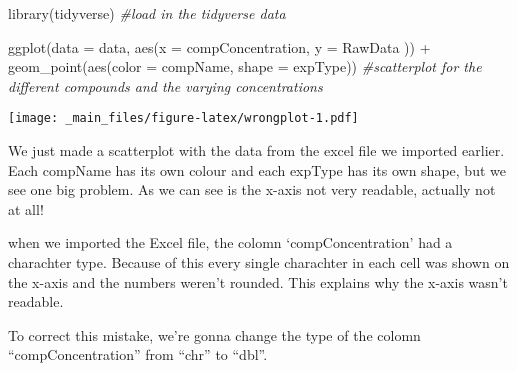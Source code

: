 \documentclass[
]{book}
\newenvironment{Shaded}{\begin{snugshade}}{\end{snugshade}}
\newcommand{\AttributeTok}[1]{\textcolor[rgb]{0.77,0.63,0.00}{#1}}
\newcommand{\CommentTok}[1]{\textcolor[rgb]{0.56,0.35,0.01}{\textit{#1}}}
\newcommand{\DecValTok}[1]{\textcolor[rgb]{0.00,0.00,0.81}{#1}}
\newcommand{\FloatTok}[1]{\textcolor[rgb]{0.00,0.00,0.81}{#1}}
\newcommand{\FunctionTok}[1]{\textcolor[rgb]{0.00,0.00,0.00}{#1}}
\newcommand{\NormalTok}[1]{#1}
\newcommand{\OtherTok}[1]{\textcolor[rgb]{0.56,0.35,0.01}{#1}}
\newcommand{\SpecialCharTok}[1]{\textcolor[rgb]{0.00,0.00,0.00}{#1}}
\newcommand{\StringTok}[1]{\textcolor[rgb]{0.31,0.60,0.02}{#1}}
\begin{document}
\begin{Shaded}
\begin{Highlighting}[]
\FunctionTok{library}\NormalTok{(tidyverse) }\CommentTok{\#load in the tidyverse data}

\FunctionTok{ggplot}\NormalTok{(}\AttributeTok{data =}\NormalTok{ data, }\FunctionTok{aes}\NormalTok{(}\AttributeTok{x =}\NormalTok{ compConcentration, }\AttributeTok{y =}\NormalTok{ RawData )) }\SpecialCharTok{+}
  \FunctionTok{geom\_point}\NormalTok{(}\FunctionTok{aes}\NormalTok{(}\AttributeTok{color =}\NormalTok{ compName, }
                 \AttributeTok{shape =}\NormalTok{ expType)) }\CommentTok{\#scatterplot for the different compounds and the varying concentrations}
\end{Highlighting}
\end{Shaded}

\texttt{[image: \_main\_files/figure-latex/wrongplot-1.pdf]}

We just made a scatterplot with the data from the excel file we imported earlier. Each compName has its own colour and each expType has its own shape, but we see one big problem. As we can see is the x-axis not very readable, actually not at all!

when we imported the Excel file, the colomn `compConcentration' had a charachter type. Because of this every single charachter in each cell was shown on the x-axis and the numbers weren't rounded. This explains why the x-axis wasn't readable.

To correct this mistake, we're gonna change the type of the colomn ``compConcentration'' from ``chr'' to ``dbl''.

\begin{Shaded}
\end{Shaded}
\end{document}
